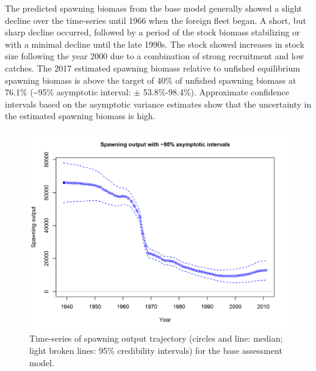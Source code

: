 \documentclass[12pt,]{article}
\begin{document}
The predicted spawning biomass from the base model generally showed a
slight decline over the time-series until 1966 when the foreign fleet
began. A short, but sharp decline occurred, followed by a period of the
stock biomass stabilizing or with a minimal decline until the late
1990s. The stock showed increases in stock size following the year 2000
due to a combination of strong recruitment and low catches. The 2017
estimated spawning biomass relative to unfished equilibrium spawning
biomass is above the target of 40\% of unfished spawning biomass at
76.1\% (\textasciitilde{}95\% asymptotic interval: \(\pm\)
53.8\%-98.4\%). Approximate confidence intervals based on the asymptotic
variance estimates show that the uncertainty in the estimated spawning
biomass is high.

\begin{figure}
\centering
\includegraphics{r4ss/plots_mod1/ts7_Spawning_output_with_95_asymptotic_intervals_intervals.png}
\caption{Time-series of spawning output trajectory (circles and line:
median; light broken lines: 95\% credibility intervals) for the base
assessment model. \label{fig:Spawnbio_all}}
\end{figure}
\end{document}
